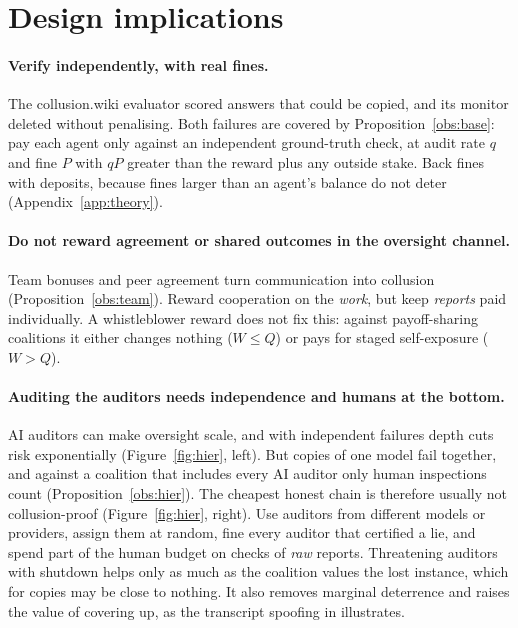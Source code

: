 \documentclass[11pt]{article}
\theoremstyle{definition}
\theoremstyle{remark}
\begin{document}
\section{Design implications}
\label{sec:design}
\paragraph{Verify independently, with real fines.} The collusion.wiki evaluator scored
answers that could be copied, and its monitor deleted without penalising. Both
failures are covered by Proposition~\ref{obs:base}: pay each agent only against an
independent ground-truth check, at audit rate $q$ and fine $P$ with $qP$ greater than the
reward plus any outside stake. Back fines with deposits, because fines larger than an
agent's balance do not deter (Appendix~\ref{app:theory}).

\paragraph{Do not reward agreement or shared outcomes in the oversight channel.} Team
bonuses and peer agreement turn communication into collusion (Proposition~\ref{obs:team}).
Reward cooperation on the \emph{work}, but keep \emph{reports} paid individually. A
whistleblower reward does not fix this: against payoff-sharing coalitions it either
changes nothing ($W\le Q$) or pays for staged self-exposure ($W>Q$).

\paragraph{Auditing the auditors needs independence and humans at the bottom.} AI
auditors can make oversight scale, and with independent failures depth cuts risk
exponentially (Figure~\ref{fig:hier}, left). But copies of one model fail together, and
against a coalition that includes every AI auditor only human inspections count
(Proposition~\ref{obs:hier}). The cheapest honest chain is therefore usually not
collusion-proof (Figure~\ref{fig:hier}, right). Use auditors from different models or
providers, assign them at random, fine every auditor that certified a lie, and spend
part of the human budget on checks of \emph{raw} reports. Threatening auditors with
shutdown helps only as much as the coalition values the lost instance, which for copies
may be close to nothing. It also removes marginal deterrence and raises the value of
covering up, as the transcript spoofing in \cite{metr2026} illustrates.
\end{document}
